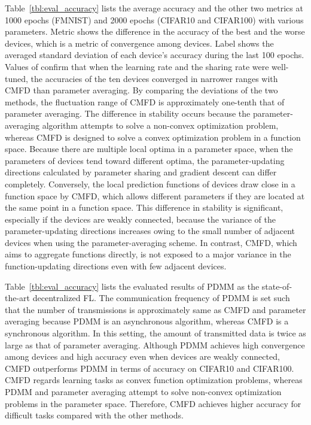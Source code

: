 \documentclass[journal]{IEEEtran}
\begin{document}
Table~\ref{tbl:eval_accuracy} lists the average accuracy and the other two metrics at 1000 epochs (\gls{FMNIST}) and 2000 epochs (CIFAR10 and CIFAR100) with various parameters.
Metric  shows the difference in the accuracy of the best and the worse devices,
which is a metric of convergence among devices.
Label  shows the averaged standard deviation of each device's accuracy during the last 100 epochs.
Values of  confirm that
when the learning rate and the sharing rate were well-tuned,
the accuracies of the ten devices
converged in narrower ranges with \gls{CMFD} than parameter averaging.
By comparing the deviations of the two methods, the fluctuation range of \gls{CMFD} is approximately one-tenth that of parameter averaging.
The difference in stability occurs because the parameter-averaging algorithm attempts to solve a non-convex optimization problem,
whereas \gls{CMFD} is designed to solve a convex optimization problem in a function space.
Because there are multiple local optima in a parameter space, when the parameters of devices tend toward different optima,
the parameter-updating directions calculated by parameter sharing and gradient descent can differ completely.
Conversely, the local prediction functions of devices draw close in a function space by \gls{CMFD},
which allows different parameters if they are located at the same point in a function space.
This difference in stability is significant, especially if the devices are weakly connected,
because the variance of the parameter-updating directions increases owing to the small number of adjacent devices
when using the parameter-averaging scheme.
In contrast, \gls{CMFD}, which aims to aggregate functions directly,
is not exposed to a major variance in the function-updating directions even with few adjacent devices.

Table~\ref{tbl:eval_accuracy} lists the evaluated results of \gls{PDMM} \cite{niwa2020edge} as the state-of-the-art decentralized \gls{FL}.
The communication frequency of \gls{PDMM} is set such that the number of transmissions is approximately same as \gls{CMFD} and parameter averaging
because \gls{PDMM} is an asynchronous algorithm, whereas \gls{CMFD} is a synchronous algorithm.
In this setting, the amount of transmitted data is twice as large as that of parameter averaging.
Although \gls{PDMM} achieves high convergence among devices and high accuracy even when devices are weakly connected,
\gls{CMFD} outperforms \gls{PDMM} in terms of accuracy on CIFAR10 and CIFAR100.
\Gls{CMFD} regards learning tasks as convex function optimization problems,
whereas \gls{PDMM} and parameter averaging attempt to solve non-convex optimization problems in the parameter space.
Therefore, \gls{CMFD} achieves higher accuracy for difficult tasks compared with the other methods.
\end{document}
